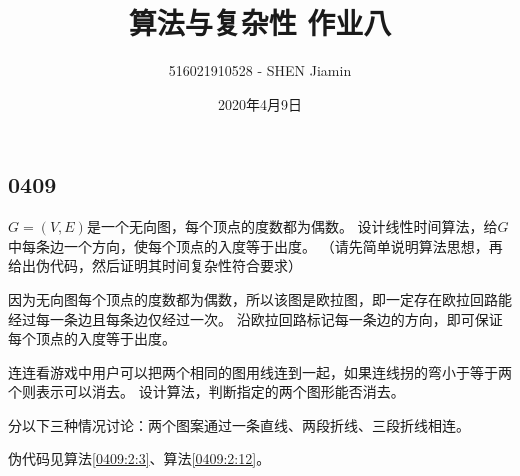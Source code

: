 \documentclass[answers]{exam}
\title{算法与复杂性 \quad 作业八}
\author{516021910528 - SHEN Jiamin}
\date{2020年4月9日}
\begin{document}
\maketitle

\begin{questions}
    \section{0409}\label{sec:0409}

    \question $G=(V,E)$是一个无向图，每个顶点的度数都为偶数。
    设计线性时间算法，给$G$中每条边一个方向，使每个顶点的入度等于出度。
    （请先简单说明算法思想，再给出伪代码，然后证明其时间复杂性符合要求）

    \begin{solution}
        因为无向图每个顶点的度数都为偶数，所以该图是欧拉图，即一定存在欧拉回路能经过每一条边且每条边仅经过一次。
        沿欧拉回路标记每一条边的方向，即可保证每个顶点的入度等于出度。
    \end{solution}

    \question 连连看游戏中用户可以把两个相同的图用线连到一起，如果连线拐的弯小于等于两个则表示可以消去。
    设计算法，判断指定的两个图形能否消去。

    \begin{solution}
        分以下三种情况讨论：两个图案通过一条直线、两段折线、三段折线相连。

        伪代码见算法\ref{0409:2:3}、算法\ref{0409:2:12}。
    \end{solution}





\end{questions}
\end{document}
